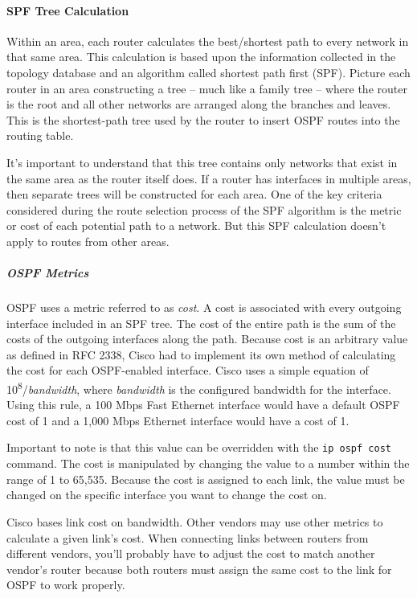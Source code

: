 \paragraph{SPF Tree Calculation}

Within an area, each router calculates the best/shortest path to every
network in that same area. This calculation is based upon the
information collected in the topology database and an algorithm called
shortest path first (SPF). Picture each router in an area constructing a
tree -- much like a family tree -- where the router is the root and all
other networks are arranged along the branches and leaves. This is the
shortest-path tree used by the router to insert OSPF routes into the
routing table.

It's important to understand that this tree contains only networks that
exist in the same area as the router itself does. If a router has
interfaces in multiple areas, then separate trees will be constructed
for each area. One of the key criteria considered during the route
selection process of the SPF algorithm is the metric or cost of each
potential path to a network. But this SPF calculation doesn't apply to
routes from other areas.

\subparagraph[OSPF
Metrics]{\texorpdfstring{\protect\hypertarget{c18.xhtmlux5cux23c18-sec-4}{}{}\protect\hypertarget{c18.xhtmlux5cux23Page_753}{}{}OSPF
Metrics}{OSPF Metrics}}

OSPF uses a metric referred to as \emph{cost}. A cost is associated with
every outgoing interface included in an SPF tree. The cost of the entire
path is the sum of the costs of the outgoing interfaces along the path.
Because cost is an arbitrary value as defined in RFC 2338, Cisco had to
implement its own method of calculating the cost for each OSPF-enabled
interface. Cisco uses a simple equation of
10\textsuperscript{8}/\emph{bandwidth}, where \emph{bandwidth} is the
configured bandwidth for the interface. Using this rule, a 100 Mbps Fast
Ethernet interface would have a default OSPF cost of 1 and a 1,000 Mbps
Ethernet interface would have a cost of 1.

Important to note is that this value can be overridden with the
\texttt{ip\ ospf\ cost} command. The cost is manipulated by changing the
value to a number within the range of 1 to 65,535. Because the cost is
assigned to each link, the value must be changed on the specific
interface you want to change the cost on.

\begin{note}
Cisco bases link cost on bandwidth.
Other vendors may use other metrics to calculate a given link's cost.
When connecting links between routers from different vendors, you'll probably have to adjust the cost to match another vendor's router
because both routers must assign the same cost to the link for OSPF to work properly.
\end{note}



